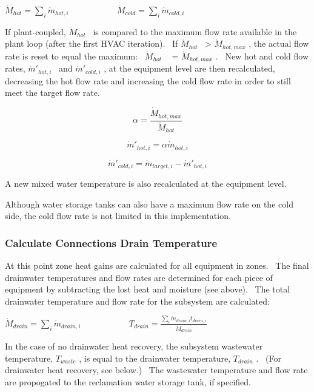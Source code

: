 \({\dot M_{hot}} = \mathop \sum \limits_i {\dot m_{hot,i}}\) ~~~~~~~~~~ \({\dot M_{cold}} = \mathop \sum \limits_i {\dot m_{cold,i}}\)

If plant-coupled, \({\dot M_{hot}}\) ~is compared to the maximum flow rate available in the plant loop (after the first HVAC iteration).~ If \({\dot M_{hot}}\) ~\textgreater{} \({\dot M_{hot,max}}\) , the actual flow rate is reset to equal the maximum:~ \({\dot M_{hot}}\) ~ = \({\dot M_{hot,max}}\) .~ New hot and cold flow rates, \({\dot m'_{hot,i}}\) ~and \({\dot m'_{cold,i}}\) , at the equipment level are then recalculated, decreasing the hot flow rate and increasing the cold flow rate in order to still meet the target flow rate.

\begin{equation}
\alpha  = \frac{{{{\dot M}_{hot,max}}}}{{{{\dot M}_{hot}}}}
\end{equation}

\begin{equation}
{\dot m'_{hot,i}} = \alpha {\dot m_{hot,i}}
\end{equation}

\begin{equation}
{\dot m'_{cold,i}} = {\dot m_{target,i}} - {\dot m'_{hot,i}}
\end{equation}

A new mixed water temperature is also recalculated at the equipment level.

Although water storage tanks can also have a maximum flow rate on the cold side, the cold flow rate is not limited in this implementation.

\subsubsection{Calculate Connections Drain Temperature}\label{calculate-connections-drain-temperature}

At this point zone heat gains are calculated for all equipment in zones.~ The final drainwater temperatures and flow rates are determined for each piece of equipment by subtracting the lost heat and moisture (see above).~ The total drainwater temperature and flow rate for the subsystem are calculated:

\({\dot M_{drain}} = \mathop \sum \limits_i {\dot m_{drain,i}}\) ~~~~~~~~~~ \({T_{drain}} = \frac{{\mathop \sum \limits_i {{\dot m}_{drain,i}}{t_{drain,i}}}}{{{{\dot M}_{drain}}}}\)

In the case of no drainwater heat recovery, the subsystem wastewater temperature, \({T_{waste}}\) , is equal to the drainwater temperature, \({T_{drain}}\) .~ (For drainwater heat recovery, see below.)~ The wastewater temperature and flow rate are propogated to the reclamation water storage tank, if specified.


